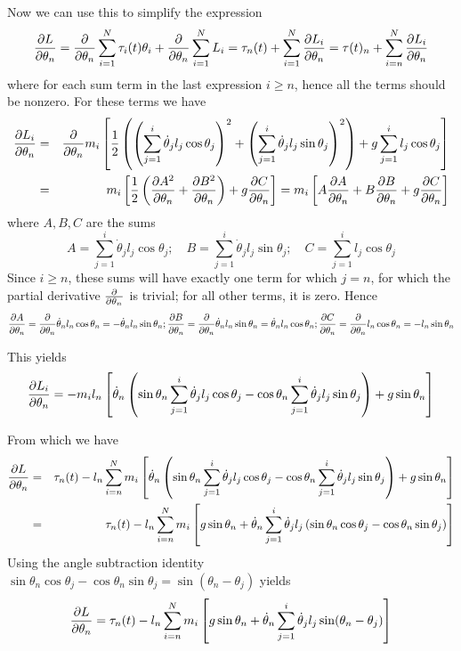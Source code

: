 \documentclass[12pt]{article}
\begin{document}
	Now we can use this to simplify the expression
	$$\pdv{L}{\theta_n}=\pdv{}{\theta_n}\sum_{i=1}^N\tau_i(t)\theta_i+\pdv{\theta_n}\sum_{i=1}^N L_i=\tau_n(t)+\sum_{i=1}^N \pdv{L_i}{\theta_n}=\tau(t)_n+\sum_{i=n}^N \pdv{L_i}{\theta_n}$$
	where for each sum term in the last expression $i\geq n$, hence all the terms should be nonzero. For these terms we have
	\begin{eqnarray*}
	\pdv{L_i}{\theta_n}&=&\pdv{\theta_n}m_i\left[\frac{1}{2}\left(\left(\sum_{j=1}^i \dot{\theta}_j l_j \cos{\theta_j}\right)^2+\left(\sum_{j=1}^i \dot{\theta}_j l_j \sin{\theta_j}\right)^2\right)+g\sum_{j=1}^i l_j \cos{\theta_j}\right]\\
	&=&m_i\left[\frac{1}{2}\left(\pdv{A^2}{\theta_n}+\pdv{B^2}{\theta_n}\right)+g\pdv{C}{\theta_n}\right]=m_i\left[A\pdv{A}{\theta_n}+B\pdv{B}{\theta_n}+g\pdv{C}{\theta_n}\right]
	\end{eqnarray*}
	where $A,B,C$ are the sums
	$$A=\sum_{j=1}^i \dot{\theta}_j l_j \cos{\theta_j};\quad B=\sum_{j=1}^i \dot{\theta}_j l_j \sin{\theta_j};\quad C=\sum_{j=1}^i l_j \cos{\theta_j}$$
	Since $i\geq n$, these sums will have exactly one term for which $j=n$, for which the partial derivative $\pdv{\theta_n}$ is trivial; for all other terms, it is zero. Hence
	$$\pdv{A}{\theta_n}=\pdv{\theta_n}\dot{\theta}_n l_n \cos{\theta_n}=-\dot{\theta}_n l_n \sin{\theta_n}; \pdv{B}{\theta_n}=\pdv{\theta_n} \dot{\theta}_n l_n \sin{\theta_n}=\dot{\theta}_n l_n \cos{\theta_n}; \pdv{C}{\theta_n}=\pdv{\theta_n} l_n \cos{\theta_n}=-l_n \sin{\theta_n}$$
	
	This yields
	$$\pdv{L_i}{\theta_n}=-m_il_n\left[\dot{\theta}_n  \left(\sin{\theta_n}\sum_{j=1}^i \dot{\theta}_j l_j \cos{\theta_j}-\cos{\theta_n}\sum_{j=1}^i \dot{\theta}_j l_j \sin{\theta_j}\right)+g \sin{\theta_n}\right]$$
	
	From which we have
	\begin{eqnarray*}
	\pdv{L}{\theta_n}&=&\tau_n(t)-l_n\sum_{i=n}^N m_i\left[\dot{\theta}_n  \left(\sin{\theta_n}\sum_{j=1}^i \dot{\theta}_j l_j \cos{\theta_j}-\cos{\theta_n}\sum_{j=1}^i \dot{\theta}_j l_j \sin{\theta_j}\right)+g \sin{\theta_n}\right]\\
	&=&\tau_n(t)-l_n\sum_{i=n}^N m_i\left[g \sin{\theta_n} + \dot{\theta}_n \sum_{j=1}^i \dot{\theta}_j l_j \left(\sin{\theta_n}\cos{\theta_j}- \cos{\theta_n}\sin{\theta_j}\right)\right]
	\end{eqnarray*}
	Using the angle subtraction identity $\sin{\theta_n}\cos{\theta_j}-\cos{\theta_n}\sin{\theta_j}=\sin(\theta_n - \theta_j)$ yields
	$$\pdv{L}{\theta_n}=\tau_n(t)-l_n\sum_{i=n}^N m_i\left[g \sin{\theta_n} + \dot{\theta}_n \sum_{j=1}^i \dot{\theta}_j l_j \sin(\theta_n - \theta_j)\right]$$
\end{document}
